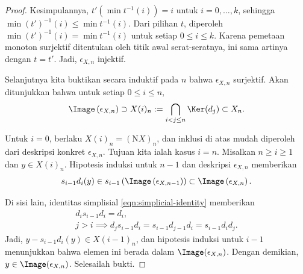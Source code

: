 \begin{proof}
	Kesimpulannya,
	$t'(\min t^{-1}(i))=i$ untuk $i=0,\ldots,k$, sehingga
	$\min(t')^{-1}(i)\leq\min t^{-1}(i)$. Dari pilihan $t$, diperoleh
	$\min(t')^{-1}(i)=\min t^{-1}(i)$ untuk setiap $0\leq i\leq k$.
	Karena pemetaan monoton surjektif ditentukan oleh titik awal
	serat-seratnya, ini sama artinya dengan $t=t'$. Jadi,
	$\epsilon_{X,n}$ injektif.

	Selanjutnya kita buktikan secara induktif pada $n$ bahwa $\epsilon_{X,n}$
	surjektif. Akan ditunjukkan bahwa untuk setiap $0\leq i\leq n$,
	\[ \Image\left( \epsilon_{X, n} \right) \supset X(i)_n := \bigcap_{i < j \leq n} \Ker(d_j) \subset X_n. \]

	Untuk $i=0$, berlaku $X(i)_n=(\mathrm{N}X)_n$, dan inklusi di atas mudah
	diperoleh dari deskripsi konkret $\epsilon_{X,n}$. Tujuan kita ialah kasus
	$i=n$. Misalkan $n\geq i\geq1$ dan $y\in X(i)_n$. Hipotesis induksi untuk
	$n-1$ dan deskripsi $\epsilon_{X,n}$ memberikan
	\[ s_{i-1} d_i(y) \in s_{i-1}\left( \Image\left(\epsilon_{X, n-1}\right) \right) \subset \Image\left( \epsilon_{X, n} \right). \]

	Di sisi lain, identitas simplisial \eqref{eqn:simplicial-identity}
	memberikan
	\begin{gather*}
		d_i s_{i-1} d_i = d_i, \\
		j > i \implies d_j s_{i-1} d_i = s_{i-1} d_{j-1} d_i = s_{i-1} d_i d_j.
	\end{gather*}
	Jadi, $y-s_{i-1}d_i(y)\in X(i-1)_n$, dan hipotesis induksi untuk $i-1$
	menunjukkan bahwa elemen ini berada dalam
	$\Image(\epsilon_{X,n})$. Dengan demikian,
	$y\in\Image(\epsilon_{X,n})$. Selesailah bukti.
\end{proof}
